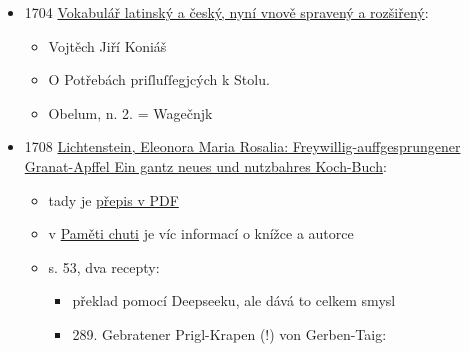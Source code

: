 \begin{itemize}
\tightlist
\item
  1704
  \href{https://bara.ujc.cas.cz/slovniky/vokabular/vokabular12.html}{Vokabulář
  latinský a český, nyní vnově spravený a rozšiřený}:

  \begin{itemize}
  \tightlist
  \item
    Vojtěch Jiří Koniáš
  \item
    O Potřebách priſluſſegjcých k Stolu.
  \item
    Obelum, n. 2. = Wagečnjk
  \end{itemize}
\item
  1708
  \href{https://unipub.uni-graz.at/obvugrdomus_druck/content/titleinfo/8109092}{Lichtenstein,
  Eleonora Maria Rosalia: Freywillig-auffgesprungener Granat-Apffel Ein
  gantz neues und nutzbahres Koch-Buch}:

  \begin{itemize}
  \tightlist
  \item
    tady je
    \href{https://unipub.uni-graz.at/download/pdf/8109092.pdf\#page=54}{přepis
    v PDF}
  \item
    v
    \href{https://kulturni-dejiny.slu.cz/data/uploads/067/upvysledky/pamet_chuti_odborna-kniha_uplatnny_2020.pdf\#page=133}{Paměti
    chuti} je víc informací o knížce a autorce
  \item
    s. 53, dva recepty:

    \begin{itemize}
    \tightlist
    \item
      překlad pomocí Deepseeku, ale dává to celkem smysl
    \item
      289. Gebratener Prigl-Krapen (!) von Gerben-Taig:


\end{itemize}
\end{itemize}
\end{itemize}
